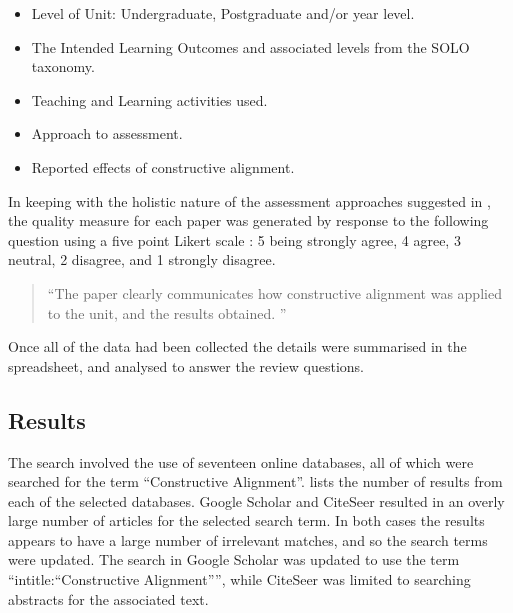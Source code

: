 \begin{itemize}[noitemsep,nolistsep]
	\item Level of Unit: Undergraduate, Postgraduate and/or year level.
	\item The Intended Learning Outcomes and associated levels from the SOLO taxonomy.
	\item Teaching and Learning activities used.
	\item Approach to assessment.
	\item Reported effects of constructive alignment.
\end{itemize}

In keeping with the holistic nature of the assessment approaches suggested in \cite{Biggs:1997}, the quality measure for each paper was generated by response to the following question using a five point Likert scale \cite{Likert:1932}: 5 being strongly agree, 4 agree, 3 neutral, 2 disagree, and 1 strongly disagree.

\begin{quote}
``The paper clearly communicates how constructive alignment was applied to the unit, and the results obtained. ''	
\end{quote}

Once all of the data had been collected the details were summarised in the spreadsheet, and analysed to answer the review questions.



\clearpage
\subsection{Results} %
\label{sub:review_results}

The search involved the use of seventeen online databases, all of which were searched for the term ``Constructive Alignment''.  lists the number of results from each of the selected databases. Google Scholar and CiteSeer resulted in an overly large number of articles for the selected search term. In both cases the results appears to have a large number of irrelevant matches, and so the search terms were updated. The search in Google Scholar was updated to use the term ``intitle:``Constructive Alignment'''', while CiteSeer was limited to searching abstracts for the associated text.

